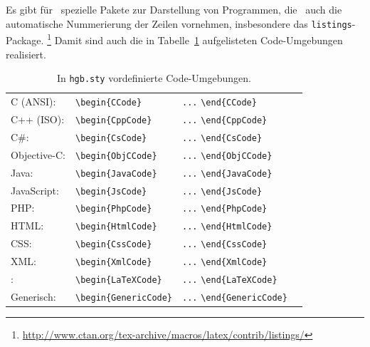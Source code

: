Es gibt für \latex\ spezielle Pakete zur Darstellung von Programmen, die \ua\ auch die automatische Nummerierung der Zeilen vornehmen, insbesondere das \texttt{listings}-Package.%
\footnote{\url{http://www.ctan.org/tex-archive/macros/latex/contrib/listings/}}
Damit sind auch die in Tabelle~\ref{tab:CodeUmgebungen} aufgelisteten Code-Umgebungen 
realisiert.
%
\begin{table}
\caption{In \nolinkurl{hgb.sty} vordefinierte Code-Umgebungen.}
\label{tab:CodeUmgebungen}
\centering
\begin{tabular}{llll}
	\hline
	C (ANSI):   & \verb!\begin{CCode}! & \verb!...! \verb!\end{CCode}! \\
	C++ (ISO):  & \verb!\begin{CppCode}! & \verb!...! \verb!\end{CppCode}! \\
	C\#:   & \verb!\begin{CsCode}! & \verb!...! \verb!\end{CsCode}! \\
	Objective-C:   & \verb!\begin{ObjCCode}! & \verb!...! \verb!\end{ObjCCode}! \\
	Java:       & \verb!\begin{JavaCode}! & \verb!...! \verb!\end{JavaCode}! \\
	JavaScript:  			& \verb!\begin{JsCode}! & \verb!...! \verb!\end{JsCode}! \\
	PHP:  			& \verb!\begin{PhpCode}! & \verb!...! \verb!\end{PhpCode}! \\
	HTML:  			& \verb!\begin{HtmlCode}! & \verb!...! \verb!\end{HtmlCode}! \\
	CSS:  			& \verb!\begin{CssCode}! & \verb!...! \verb!\end{CssCode}! \\
	XML:  			& \verb!\begin{XmlCode}! & \verb!...! \verb!\end{XmlCode}! \\
	\latex:     & \verb!\begin{LaTeXCode}! & \verb!...! \verb!\end{LaTeXCode}! \\
	Generisch:  & \verb!\begin{GenericCode}! & \verb!...! \verb!\end{GenericCode}! \\
	\hline
\end{tabular}
\end{table}
